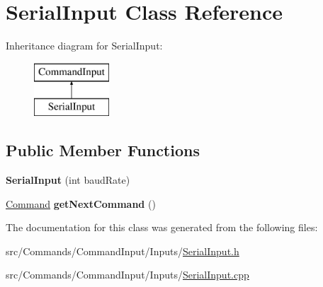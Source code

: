 \hypertarget{classSerialInput}{}\section{Serial\+Input Class Reference}
\label{classSerialInput}
Inheritance diagram for Serial\+Input\+:\begin{figure}[H]
\begin{center}
\leavevmode
\includegraphics[height=2.000000cm]{classSerialInput}
\end{center}
\end{figure}
\subsection*{Public Member Functions}
\begin{DoxyCompactItemize}
\item 
\hypertarget{classSerialInput_a5e71f6970e190f77b5bbbeedabbefbc5}{}{\bfseries Serial\+Input} (int baud\+Rate)\label{classSerialInput_a5e71f6970e190f77b5bbbeedabbefbc5}

\item 
\hypertarget{classSerialInput_a9f4506bbeb54289553aab297d1fc7124}{}\hyperlink{classCommand}{Command} {\bfseries get\+Next\+Command} ()\label{classSerialInput_a9f4506bbeb54289553aab297d1fc7124}

\end{DoxyCompactItemize}


The documentation for this class was generated from the following files\+:\begin{DoxyCompactItemize}
\item 
src/\+Commands/\+Command\+Input/\+Inputs/\hyperlink{SerialInput_8h}{Serial\+Input.\+h}\item 
src/\+Commands/\+Command\+Input/\+Inputs/\hyperlink{SerialInput_8cpp}{Serial\+Input.\+cpp}\end{DoxyCompactItemize}
